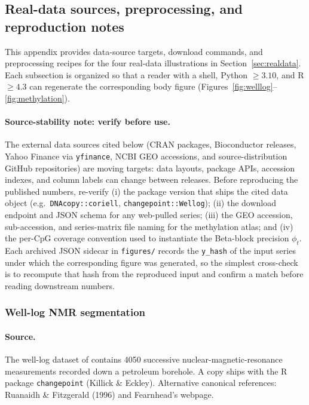 \subsection{Real-data sources, preprocessing, and reproduction notes}
\label{app:real-data}

This appendix provides data-source targets, download commands, and preprocessing recipes for the
four real-data illustrations in Section~\ref{sec:realdata}. Each subsection is organized so that a
reader with a shell, Python $\ge 3.10$, and R $\ge 4.3$ can regenerate the corresponding body
figure (Figures~\ref{fig:welllog}--\ref{fig:methylation}).

\paragraph{Source-stability note: verify before use.}
The external data sources cited below (CRAN packages, Bioconductor releases, Yahoo Finance via
\texttt{yfinance}, NCBI GEO accessions, and source-distribution GitHub repositories) are moving
targets: data layouts, package APIs, accession indexes, and column labels can change between
releases. Before reproducing the published numbers, re-verify (i) the package version that ships
the cited data object (e.g.\ \texttt{DNAcopy::coriell}, \texttt{changepoint::Wellog}); (ii) the
download endpoint and JSON schema for any web-pulled series; (iii) the GEO accession,
sub-accession, and series-matrix file naming for the methylation atlas; and (iv) the per-CpG
coverage convention used to instantiate the Beta-block precision $\phi_t$. Each archived JSON
sidecar in \texttt{figures/} records the \texttt{y\_hash} of the input series under which the
corresponding figure was generated, so the simplest cross-check is to recompute that hash from
the reproduced input and confirm a match before reading downstream numbers.

\subsubsection{Well-log NMR segmentation}
\label{app:real-data-welllog}

\paragraph{Source.}
The well-log dataset of \citet{fearnhead2006exact} contains 4050 successive nuclear-magnetic-resonance
measurements recorded down a petroleum borehole. A copy ships with the R package
\texttt{changepoint} (Killick \& Eckley). Alternative canonical references: Ruanaidh \& Fitzgerald
(1996) and Fearnhead's webpage.

